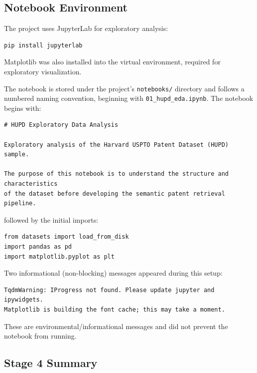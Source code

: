 \documentclass[11pt]{article}
\begin{document}
\subsection{Notebook Environment}

The project uses JupyterLab for exploratory analysis:

\begin{lstlisting}
pip install jupyterlab
\end{lstlisting}

\noindent Matplotlib was also installed into the virtual environment, required for exploratory visualization.

\noindent The notebook is stored under the project's \texttt{notebooks/} directory and follows a numbered naming convention, beginning with \texttt{01\_hupd\_eda.ipynb}. The notebook begins with:

\begin{lstlisting}
# HUPD Exploratory Data Analysis

Exploratory analysis of the Harvard USPTO Patent Dataset (HUPD) sample.

The purpose of this notebook is to understand the structure and characteristics
of the dataset before developing the semantic patent retrieval pipeline.
\end{lstlisting}

\noindent followed by the initial imports:

\begin{lstlisting}
from datasets import load_from_disk
import pandas as pd
import matplotlib.pyplot as plt
\end{lstlisting}

\noindent Two informational (non-blocking) messages appeared during this setup:

\begin{lstlisting}
TqdmWarning: IProgress not found. Please update jupyter and ipywidgets.
Matplotlib is building the font cache; this may take a moment.
\end{lstlisting}

\noindent These are environmental/informational messages and did not prevent the notebook from running.

\subsection{Stage 4 Summary}
\end{document}
